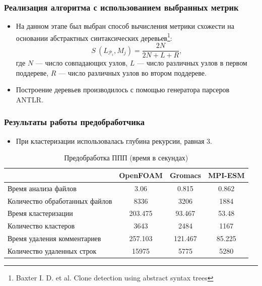 \documentclass{beamer}
\begin{document}
\begin{frame}
\frametitle{Реализация алгоритма с использованием выбранных метрик}
\begin{itemize}
	\item На данном этапе был выбран способ вычисления метрики схожести на основании  абстрактных синтаксических деревьев\footnote[1]{Baxter I. D. et al. Clone detection using abstract syntax trees}:
\begin{equation}
S ~ (L_{\mathcal{P}_i}, M_j) = \frac{2 N}{2 N + L + R},
\end{equation}
где $N$ — число совпадающих узлов, $L$ — число различных узлов в первом поддереве, $R$ — число различных узлов во втором поддереве.
	\item Построение деревьев производилось с помощью генератора парсеров ANTLR.
\end{itemize}

\end{frame}



\begin{frame}
\frametitle{Результаты работы предобработчика}
\begin{itemize}
	\item При кластеризации использовалась глубина рекурсии, равная 3.
\end{itemize}
\begin{small}	
\renewcommand{\arraystretch}{1.2} %
\renewcommand{\tabcolsep}{0.3cm}  
\begin{table}
\begin{tabular}{|p{3.8cm}|c|c|c|}
\hline
 & OpenFOAM &  Gromacs & MPI-ESM\\
\hline
Время анализа файлов & 3.06 & 0.815 & 0.862\\
\hline
Количество \newline обработанных файлов & 8336 & 3206 & 1884 \\
\hline
Время кластеризации  & 203.475 & 93.467 & 53.48\\
\hline
Количество кластеров & 3643 & 2484 & 1167\\
\hline
Время \newline удаления комментариев & 257.103 & 121.467 & 85.225\\
\hline
Количество удаленных строк & 15975 & 5775 & 5280\\
\hline
\end{tabular}
\caption{Предобработка ППП (время в секундах)}
\end{table}
\end{small}
\end{frame}
\end{document}
